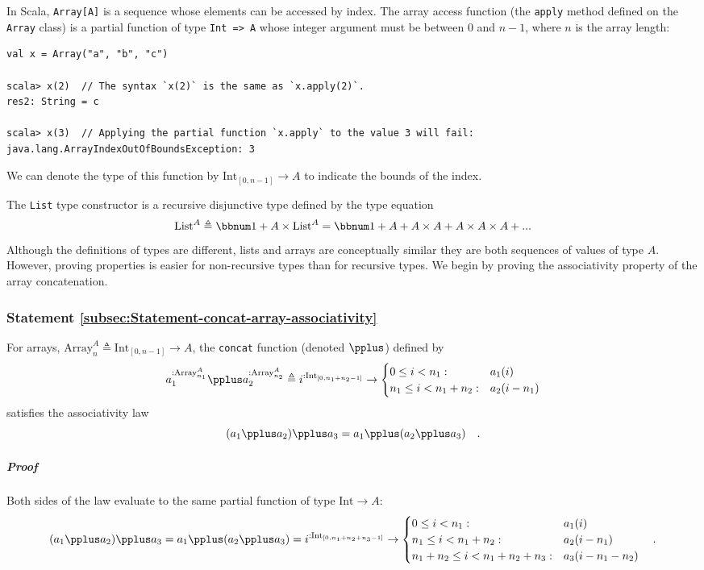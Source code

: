 In Scala, \lstinline!Array[A]! is a sequence whose elements can be
accessed by index. The array access function (the \lstinline!apply!
method defined on the \lstinline!Array! class) is a partial function
of type \lstinline!Int => A! whose integer argument must be between
$0$ and $n-1$, where $n$ is the array length:
\begin{lstlisting}
val x = Array("a", "b", "c")

scala> x(2)  // The syntax `x(2)` is the same as `x.apply(2)`. 
res2: String = c

scala> x(3)  // Applying the partial function `x.apply` to the value 3 will fail:
java.lang.ArrayIndexOutOfBoundsException: 3
\end{lstlisting}
We can denote the type of this function by $\text{Int}_{[0,n-1]}\rightarrow A$
to indicate the bounds of the index.

The \lstinline!List! type constructor is a recursive disjunctive
type defined by the type equation
\[
\text{List}^{A}\triangleq\bbnum 1+A\times\text{List}^{A}=\bbnum 1+A+A\times A+A\times A\times A+...
\]
Although the definitions of types are different, lists and arrays
are conceptually similar \textemdash{} they are both sequences of
values of type $A$. However, proving properties is easier for non-recursive
types than for recursive types. We begin by proving the associativity
property of the array concatenation. 

\subsubsection{Statement \label{subsec:Statement-concat-array-associativity}\ref{subsec:Statement-concat-array-associativity}}

For arrays, $\text{Array}_{n}^{A}\triangleq\text{Int}_{[0,n-1]}\rightarrow A$,
the \lstinline!concat! function (denoted $\pplus$) defined by
\[
a_{1}^{:\text{Array}_{n_{1}}^{A}}\pplus a_{2}^{:\text{Array}_{n_{2}}^{A}}\triangleq i^{:\text{Int}_{[0,n_{1}+n_{2}-1]}}\rightarrow\begin{cases}
0\leq i<n_{1}: & a_{1}(i)\\
n_{1}\leq i<n_{1}+n_{2}: & a_{2}(i-n_{1})
\end{cases}
\]
satisfies the associativity law
\[
(a_{1}\pplus a_{2})\pplus a_{3}=a_{1}\pplus(a_{2}\pplus a_{3})\quad.
\]


\subparagraph{Proof}

Both sides of the law evaluate to the same partial function of type
$\text{Int}\rightarrow A$:
\[
(a_{1}\pplus a_{2})\pplus a_{3}=a_{1}\pplus(a_{2}\pplus a_{3})=i^{:\text{Int}_{[0,n_{1}+n_{2}+n_{3}-1]}}\rightarrow\begin{cases}
0\leq i<n_{1}: & a_{1}(i)\\
n_{1}\leq i<n_{1}+n_{2}: & a_{2}(i-n_{1})\\
n_{1}+n_{2}\leq i<n_{1}+n_{2}+n_{3}: & a_{3}(i-n_{1}-n_{2})
\end{cases}\quad.
\]

